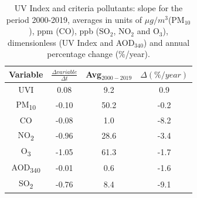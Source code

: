 \documentclass[10pt]{article}
\begin{document}
\begin{table}[H]
  \centering
  \begin{tabular}{cccc} \hline
    Variable               & $\frac{\Delta variable}{\Delta t}$ & Avg$_{2000-2019}$ & $\Delta(\%/year)$ \\ \hline
    UVI                    & 0.08                               & 9.2               & 0.9               \\
    PM\textsubscript{10}   & -0.10                              & 50.2              & -0.2              \\
    CO                     & -0.08                              & 1.0               & -8.2              \\
    NO\textsubscript{2}    & -0.96                              & 28.6              & -3.4              \\
    O\textsubscript{3}     & -1.05                              & 61.3              & -1.7              \\
    AOD\textsubscript{340} & -0.01                              & 0.6               & -1.6              \\
    SO\textsubscript{2}    & -0.76                              & 8.4               & -9.1              \\
    \hline
  \end{tabular}
  \caption{{{{UV Index and criteria pollutants: slope for the period 2000-2019, averages in units of $\mu g/m^3$(PM$_{10}$), ppm (CO), ppb (SO$_2$, NO$_2$ and O$_3$), dimensionless (UV Index and AOD$_{340}$) and annual percentage change (\%/year).}}}}
  \label{table:uvindex}
\end{table}
\end{document}
